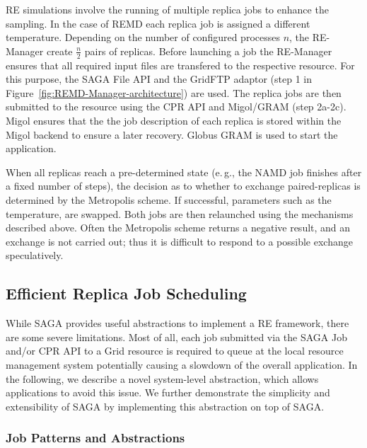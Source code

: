 \documentclass{rspublic}
\newcommand{\remanager}[1]{RE-Manager }
\begin{document}
RE simulations involve the running of multiple replica jobs to enhance the sampling. 
In the case of REMD each replica job is assigned a different temperature.  
Depending on the number of configured processes $n$, the \remanager\
create $\frac{n}{2}$ pairs of replicas.
Before launching a job the \remanager\ ensures that all required input 
files are transfered to the respective resource. For this purpose, the SAGA File API and the
GridFTP adaptor (step 1 in Figure~\ref{fig:REMD-Manager-architecture})
are used.  The replica jobs are then submitted to the resource
using the CPR API and Migol/GRAM (step 2a-2c). Migol ensures that the
the job description of each replica is stored within the Migol backend
to ensure a later recovery. Globus GRAM is used to start the
application.

When all replicas reach a pre-determined state (e.\,g., the NAMD job finishes 
after a fixed number of steps), the decision as to whether to exchange
paired-replicas is determined by the Metropolis scheme. If successful,
parameters such as the temperature, are swapped. Both jobs are then
relaunched using the mechanisms described above. Often the Metropolis
scheme returns a negative result, and an exchange is not carried out;
thus it is difficult to respond to a possible exchange speculatively. 
           
\subsection{Efficient Replica Job Scheduling}

While SAGA provides useful abstractions to implement a RE framework, there
are some severe limitations. Most of all, each job submitted via the
SAGA Job and/or CPR API to a Grid resource is required to queue at the local 
resource management system potentially causing a slowdown of the overall application. 
In the following, we describe a novel system-level abstraction, which allows 
applications to avoid this issue. We further demonstrate the simplicity and 
extensibility of SAGA by implementing this abstraction on top of SAGA.



\subsubsection{Job Patterns and Abstractions} 
\end{document}
